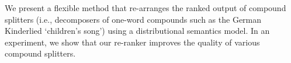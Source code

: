 We present a flexible method that re-arranges the ranked output of compound splitters (i.e., decomposers of one-word compounds such as the German Kinderlied ‘children's song') using a distributional semantics model. In an experiment, we show that our re-ranker improves the quality of various compound splitters.
